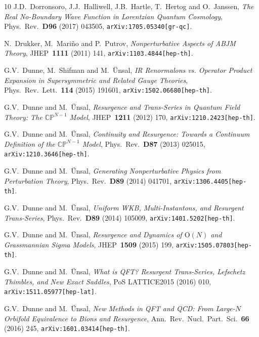 \documentclass[11pt,a4paper]{article}
\def\BC{{\mathbb C}}
\def\BP{{\mathbb P}}
\begin{document}
\begin{thebibliography}{10}
J.D.~Dorronsoro, J.J.~Halliwell, J.B.~Hartle, T.~Hertog and O.~Janssen,
\textit{The Real No-Boundary Wave Function in Lorentzian Quantum Cosmology},
Phys.\ Rev.\ \textbf{D96} (2017) 043505,
\texttt{arXiv:1705.05340[gr-qc]}.

N.~Drukker, M.~Mari\~no and P.~Putrov,
\textit{Nonperturbative Aspects of ABJM Theory},
JHEP\ \textbf{1111} (2011) 141,
\texttt{arXiv:1103.4844[hep-th]}.

G.V.~Dunne, M.~Shifman and M.~\"Unsal,
\textit{IR Renormalons vs. Operator Product Expansion in Supersymmetric and Related Gauge Theories},
Phys.\ Rev.\ Lett.\ \textbf{114} (2015) 191601,
\texttt{arXiv:1502.06680[hep-th]}.

G.V.~Dunne and M.~\"Unsal,
\textit{Resurgence and Trans-Series in Quantum Field Theory: The $\BC\BP^{N-1}$ Model},
JHEP\ \textbf{1211} (2012) 170,
\texttt{arXiv:1210.2423[hep-th]}.

G.V.~Dunne and M.~\"Unsal,
\textit{Continuity and Resurgence: Towards a Continuum Definition of the $\BC\BP^{N-1}$ Model},
Phys.\ Rev.\ \textbf{D87} (2013) 025015,
\texttt{arXiv:1210.3646[hep-th]}.

G.V.~Dunne and M.~\"Unsal,
\textit{Generating Nonperturbative Physics from Perturbation Theory},
Phys.\ Rev.\ \textbf{D89} (2014) 041701,
\texttt{arXiv:1306.4405[hep-th]}.

G.V.~Dunne and M.~\"Unsal,
\textit{Uniform WKB, Multi-Instantons, and Resurgent Trans-Series},
Phys.\ Rev.\ \textbf{D89} (2014) 105009,
\texttt{arXiv:1401.5202[hep-th]}.

G.V.~Dunne and M.~\"Unsal,
\textit{Resurgence and Dynamics of $\text{O}(N)$ and Grassmannian Sigma Models},
JHEP\ \textbf{1509} (2015) 199,
\texttt{arXiv:1505.07803[hep-th]}.

G.V.~Dunne and M.~\"Unsal,
\textit{What is QFT? Resurgent Trans-Series, Lefschetz Thimbles, and New Exact Saddles},
PoS LATTICE2015 (2016) 010,
\texttt{arXiv:1511.05977[hep-lat]}.

G.V.~Dunne and M.~\"Unsal,
\textit{New Methods in QFT and QCD: From Large-$N$ Orbifold Equivalence to Bions and Resurgence},
Ann.\ Rev.\ Nucl.\ Part.\ Sci.\ \textbf{66} (2016) 245,
\texttt{arXiv:1601.03414[hep-th]}.


\end{thebibliography}
\end{document}
